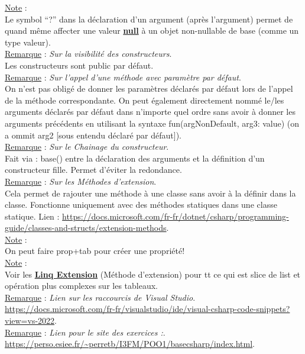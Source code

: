 \documentclass[a4paper,12pt,twoside]{article}
\newcommand{\urlcolor}{magenta}  %
\newcommand{\keycolor}{purple} %
\newcommand{\incode}[1]{{\footnotesize\ttfamily #1}} %
\newcommand{\rem}[2]{\noindent\underline{Remarque} : \textit{#1}.\\ \indent #2}
\newcommand{\note}[1]{\noindent\underline{Note} : \\ \indent #1}
\newcommand{\keyref}[2]{\hypersetup{urlcolor=\keycolor} \href{#1}{\textbf{#2}}\hypersetup{urlcolor=\urlcolor}}
\begin{document}
\note{Le symbol ``?'' dans la déclaration d'un argument (après l'argument) permet de quand même affecter une valeur \keyref{https://docs.microsoft.com/fr-fr/dotnet/csharp/language-reference/keywords/null}{null} à un objet non-nullable de base (comme un type valeur).}\\

\rem{Sur la visibilité des constructeurs}{Les constructeurs sont public par défaut.}\\

\rem{Sur l'appel d'une méthode avec paramètre par défaut}{On n'est pas obligé de donner les paramètres déclarés par défaut lors de l'appel de la méthode correspondante. On peut également directement nommé le/les arguments déclarés par défaut dans n'importe quel ordre sans avoir à donner les arguments précédents en utilisant la syntaxe \incode{fun(argNonDefault, arg3: value)} (on a ommit \incode{arg2} [sous entendu déclaré par défaut]).}\\

\rem{Sur le Chainage du constructeur}{Fait via \incode{: base()} entre la déclaration des arguments et la définition d'un constructeur fille. Permet d'éviter la redondance.} \\

\rem{Sur les Méthodes d'extension}{Cela permet de rajouter une méthode à une classe sans avoir à la définir dans la classe. Fonctionne uniquement avec des méthodes statiques dans une classe statique. Lien : \url{https://docs.microsoft.com/fr-fr/dotnet/csharp/programming-guide/classes-and-structs/extension-methods}.}\\

\note{On peut faire prop+tab pour créer une propriété!}\\

\note{Voir les \keyref{https://docs.microsoft.com/fr-fr/dotnet/csharp/programming-guide/classes-and-structs/extension-methods}{Linq Extension} (Méthode d'extension) pour tt ce qui est slice de \incode{list} et opération plus complexes sur les tableaux.}\\

\rem{Lien sur les raccourcis de Visual Studio}{\url{https://docs.microsoft.com/fr-fr/visualstudio/ide/visual-csharp-code-snippets?view=vs-2022}.}\\

\rem{Lien pour le site des exercices :}{\url{https://perso.esiee.fr/~perretb/I3FM/POO1/basecsharp/index.html}.}\\
\end{document}
